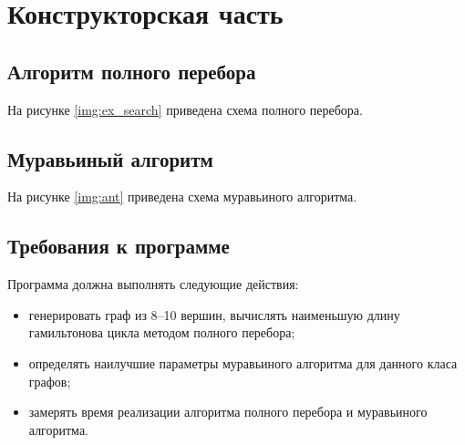 \chapter{Конструкторская часть}

\section{Алгоритм полного перебора}
На рисунке \ref{img:ex_search} приведена схема полного перебора.

\clearpage

\section{Муравьиный алгоритм}
На рисунке \ref{img:ant} приведена схема муравьиного алгоритма.

\clearpage

\section{Требования к программе}
Программа должна выполнять следующие действия:
\begin{itemize}
	\item генерировать граф из 8--10 вершин, вычислять наименьшую длину гамильтонова цикла методом полного перебора;
	\item определять наилучшие параметры муравьиного алгоритма для данного класа графов;
	\item замерять время реализации алгоритма полного перебора и муравьиного алгоритма.
\end{itemize}

